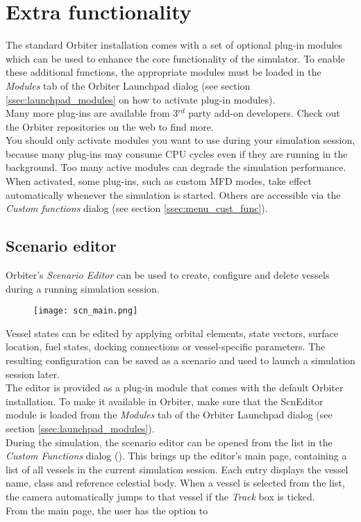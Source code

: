 \documentclass[Orbiter User Manual.tex]{subfiles}
\begin{document}
\section{Extra functionality}
\label{sec:extra}
The standard Orbiter installation comes with a set of optional plug-in modules which can be used to enhance the core functionality of the simulator. To enable these additional functions, the appropriate modules must be loaded in the \textit{Modules} tab of the Orbiter Launchpad dialog (see section \ref{ssec:launchpad_modules} on how to activate plug-in modules).\\
Many more plug-ins are available from 3$^{rd}$ party add-on developers. Check out the Orbiter repositories on the web to find more.\\
You should only activate modules you want to use during your simulation session, because many plug-ins may consume CPU cycles even if they are running in the background. Too many active modules can degrade the simulation performance.\\
When activated, some plug-ins, such as custom MFD modes, take effect automatically whenever the simulation is started. Others are accessible via the \textit{Custom functions} dialog (see section \ref{ssec:menu_cust_func}).


\subsection{Scenario editor}
\label{ssec:scn_editor}
Orbiter's \textit{Scenario Editor} can be used to create, configure and delete vessels during a running simulation session.

\begin{figure}[H]
	\centering
	\texttt{[image: scn\_main.png]}
\end{figure}

\noindent
Vessel states can be edited by applying orbital elements, state vectors, surface location, fuel states, docking connections or vessel-specific parameters. The resulting configuration can be saved as a scenario and used to launch a simulation session later.\\
The editor is provided as a plug-in module that comes with the default Orbiter installation. To make it available in Orbiter, make sure that the ScnEditor module is loaded from the \textit{Modules} tab of the Orbiter Launchpad dialog (see section \ref{ssec:launchpad_modules}).\\
During the simulation, the scenario editor can be opened from the list in the \textit{Custom Functions} dialog (\Ctrl{}). This brings up the editor's main page, containing a list of all vessels in the current simulation session. Each entry displays the vessel name, class and reference celestial body. When a vessel is selected from the list, the camera automatically jumps to that vessel if the \textit{Track} box is ticked.\\
From the main page, the user has the option to
\end{document}
